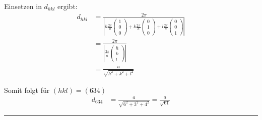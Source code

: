 \documentclass{article}
\begin{document}
{	Einsetzen in $d_{hkl}$ ergibt:
		\begin{align*}
			d_{hkl} &= \frac{2\pi}{
			\left| 
			h \frac{2\pi}{a}
			\begin{pmatrix}
				1\\0\\0
			\end{pmatrix}
			+
			k \frac{2\pi}{a}
			\begin{pmatrix}
				0\\1\\0
			\end{pmatrix}
			+
			l \frac{2\pi}{a}
			\begin{pmatrix}
				0\\0\\1
			\end{pmatrix}
			\right| }
			\\
			&= \frac{2\pi}{
			\left|
			\frac{2\pi}{a}
			\begin{pmatrix}
				h\\k\\l
			\end{pmatrix}
			\right| } \\
			&= \frac{a}{\sqrt{h^2 + k^2 + l^2}}
		\end{align*}
	
	Somit folgt für $(hkl) = (634)$
		\begin{align*}
			d_{634} &= \frac{a}{\sqrt{6^2 + 3^2 + 4^2}} = \frac{a}{\sqrt{61}}
		\end{align*}
\hrule
}


\newpage
\end{document}
